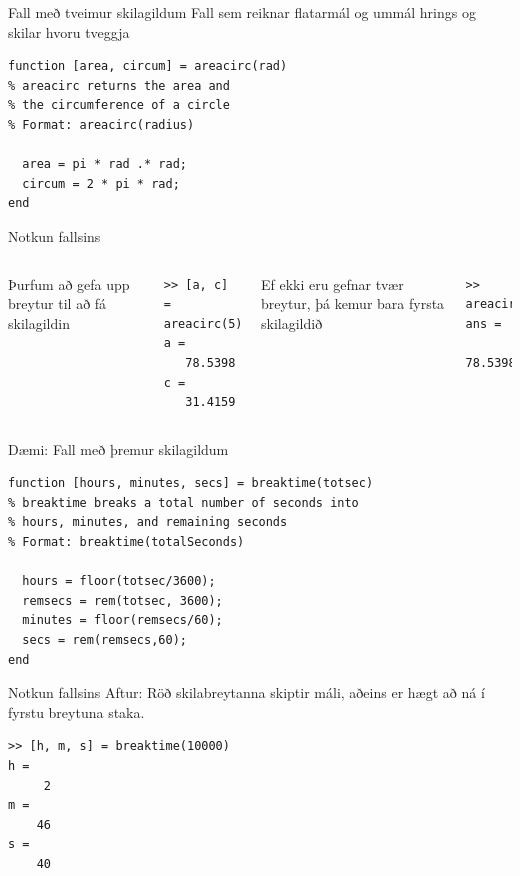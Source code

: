 \documentclass{beamer}
\begin{document}
\begin{frame}[fragile]{Fall með tveimur skilagildum}
\vspace{\baselineskip}
Fall sem reiknar flatarmál og ummál hrings og skilar hvoru tveggja
\begin{verbatim}
function [area, circum] = areacirc(rad)
% areacirc returns the area and 
% the circumference of a circle
% Format: areacirc(radius)
    
  area = pi * rad .* rad;
  circum = 2 * pi * rad;
end
\end{verbatim}
\end{frame}

\begin{frame}[fragile]{Notkun fallsins}
\begin{columns}
Þurfum að gefa upp breytur til að fá skilagildin
\begin{verbatim}
>> [a, c] = areacirc(5)
a =
   78.5398
c =
   31.4159
\end{verbatim}
Ef ekki eru gefnar tvær breytur, þá kemur bara fyrsta skilagildið
\begin{verbatim}
>> areacirc(5)
ans =
   78.5398
\end{verbatim}
\end{columns}
\end{frame}

\begin{frame}[fragile]{Dæmi: Fall með þremur skilagildum}
\vspace{\baselineskip}
\begin{verbatim}
function [hours, minutes, secs] = breaktime(totsec)
% breaktime breaks a total number of seconds into
% hours, minutes, and remaining seconds
% Format: breaktime(totalSeconds)

  hours = floor(totsec/3600);
  remsecs = rem(totsec, 3600);
  minutes = floor(remsecs/60);
  secs = rem(remsecs,60);
end
\end{verbatim}
\end{frame}

\begin{frame}[fragile]{Notkun fallsins}
Aftur: Röð skilabreytanna skiptir máli, aðeins er hægt að ná í fyrstu breytuna staka.
\begin{verbatim}
>> [h, m, s] = breaktime(10000)
h =
     2
m =
    46
s =
    40
\end{verbatim}

\end{frame}
\end{document}
